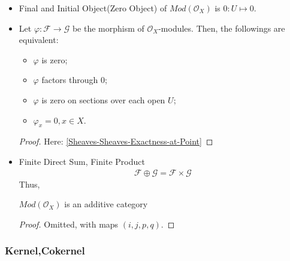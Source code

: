 \documentclass[Total.tex]{subfiles}
\begin{document}
		\begin{itemize}
			\item Final and Initial Object(Zero Object) of $Mod(\mathcal{O}_X)$ is $0:U\mapsto 0$. 
			
			\item \begin{lemma}
				Let $\varphi:\mathcal{F}\rightarrow \mathcal{G}$ be the morphism of $\mathcal{O}_X$-modules. Then, the followings are equivalent:
				\begin{itemize}
					\item $\varphi$ is zero;
					\item $\varphi$ factors through $0$;
					\item $\varphi$ is zero on sections over each open $U$;
					\item $\varphi_x=0,x\in X$.
				\end{itemize}
			\end{lemma}
			\begin{proof}
				Here: \ref{Sheaves-Sheaves-Exactness-at-Point}
			\end{proof}
			\item Finite Direct Sum, Finite Product
			\begin{gather*}
				\mathcal{F}\oplus \mathcal{G}=\mathcal{F}\times \mathcal{G}
			\end{gather*}
			Thus,
			\begin{proposition}
				 $Mod(\mathcal{O}_X)$ is an additive category
			\end{proposition}
			\begin{proof}
				Omitted, with maps $(i,j,p,q)$.
			\end{proof}
		\end{itemize}
		
		\subsubsection{Kernel,Cokernel}
		
\end{document}
